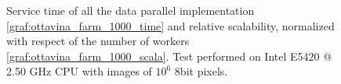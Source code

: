\begin{figure}[p]
\centering
{}
\caption{ Service time of all the data parallel implementation \ref{graf:ottavina_farm_1000_time} and relative scalability, normalized with respect of the number of workers \ref{graf:ottavina_farm_1000_scala}. Test performed on Intel E5420 @ 2.50 GHz CPU with images of $10^6$ 8bit pixels.}
\label{chart:ottavina_alldata_1000}
\end{figure}

